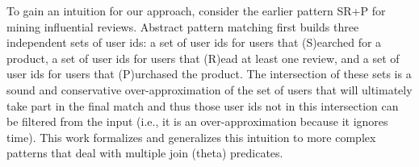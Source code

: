 


To gain an intuition for our approach, consider the earlier pattern SR+P for
mining influential reviews.  Abstract pattern matching first builds three
independent sets of user ids: a set of user ids for users that (S)earched for a
product, a set of user ids for users that (R)ead at least one review, and a set
of user ids for users that (P)urchased the product.  The intersection of these
sets is a sound and conservative over-approximation of the set of users that
will ultimately take part in the final match and thus those user ids not in this
intersection can be filtered from the input (i.e., it is an over-approximation
because it ignores time).  %
This work formalizes and generalizes this intuition to more complex patterns
that deal with multiple join (theta) predicates.

